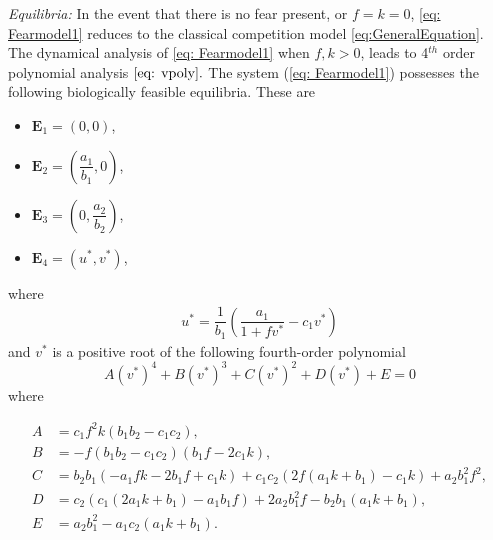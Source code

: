\documentclass[10pt]{amsart}
\theoremstyle{definition}
\begin{document}
\textit{Equilibria:} In the event that there is no fear present, or $f=k=0$, \eqref{eq: Fearmodel1} reduces to the classical competition model \eqref{eq:GeneralEquation}. The dynamical analysis of \eqref{eq: Fearmodel1} when $f,k>0$, leads to 4$^{th}$ order polynomial analysis $\eqref{eq: vpoly}.$ The system (\ref{eq: Fearmodel1}) possesses the following biologically feasible equilibria. These are 
\begin{itemize}
\item $\mathbf{E}_1=(0,0)$,
\item $\mathbf{E}_2=\left(\dfrac{a_1}{b_1},0 \right)$,
\item $\mathbf{E}_3=\left(0,\dfrac{a_2}{b_2} \right)$,
\item $\mathbf{E}_4=\left(u^*,v^*\right)$,
\end{itemize}
where 
\begin{align}\label{u_star}
	u^*=\dfrac{1}{b_1}\left(\dfrac{a_1}{1+fv^*}-c_1 v^* \right)
\end{align}
and $v^*$ is a positive root of the following fourth-order polynomial
\begin{equation}
\label{eq: vpoly}
A(v^*)^4+B(v^*)^3+C(v^*)^2+D(v^*)+E=0
\end{equation}
where  

\begin{equation}
\begin{split}
A&=c_1 f^2 k \left(b_1 b_2-c_1 c_2\right),\\
B&=-f \left(b_1 b_2-c_1 c_2\right) \left(b_1 f-2 c_1 k\right),\\
C&=b_2 b_1 \left(-a_1 f k-2 b_1 f+c_1 k\right)+c_1 c_2 \left(2 f \left(a_1 k+b_1\right)-c_1 k\right)+a_2 b_1^2 f^2,\\
D&=c_2 \left(c_1 \left(2 a_1 k+b_1\right)-a_1 b_1 f\right)+2 a_2 b_1^2 f-b_2 b_1 \left(a_1 k+b_1\right),\\
E&=a_2 b_1^2-a_1 c_2 \left(a_1 k+b_1\right).
\end{split}
\end{equation}
\end{document}
